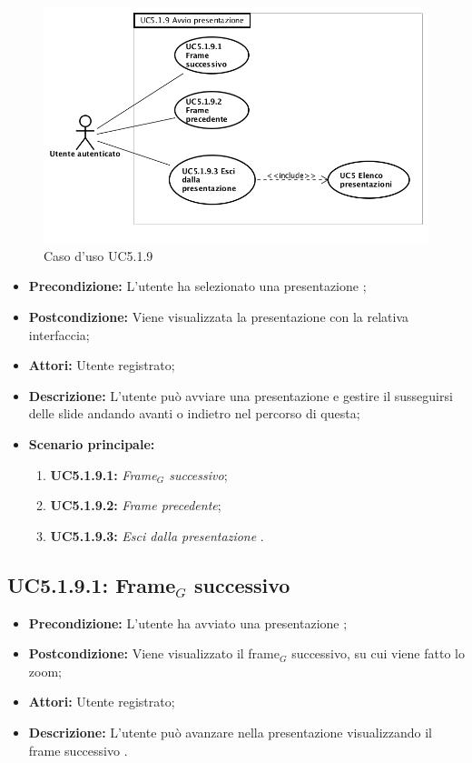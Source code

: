 \begin{figure}[h]
	\begin{center}
	\includegraphics[scale=0.6]{diagram/UC5-1-9.png}
	\caption{Caso d'uso UC5.1.9}
	\end{center}
\end{figure}
\begin{itemize}
	\item \textbf{Precondizione:} L'utente ha selezionato una presentazione ;
	\item \textbf{Postcondizione:} Viene visualizzata la presentazione con la relativa interfaccia;
	\item \textbf{Attori:} Utente registrato;
	\item \textbf{Descrizione:} L'utente può avviare una presentazione e gestire il susseguirsi delle slide andando avanti o indietro nel percorso di questa;
	\item \textbf{Scenario principale:}
	\begin{enumerate}
		\item \textbf{ UC5.1.9.1:} \textit{ Frame$_G$ successivo};
		\item \textbf{ UC5.1.9.2:} \textit{ Frame precedente};
		\item \textbf{ UC5.1.9.3:} \textit{ Esci dalla presentazione }.
	\end{enumerate}
\end{itemize}
\subsection{ UC5.1.9.1: Frame$_G$ successivo}

\begin{itemize}
	\item \textbf{Precondizione:} L'utente ha avviato una presentazione ;
	\item \textbf{Postcondizione:} Viene visualizzato il frame$_G$ successivo, su cui viene fatto lo zoom;
	\item \textbf{Attori:} Utente registrato;
	\item \textbf{Descrizione:} L'utente può avanzare nella presentazione visualizzando il frame successivo .
\end{itemize}
